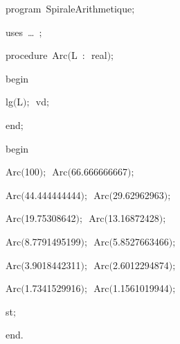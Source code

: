 
{
\parindent {}
\medskip

\carrenoir
\vspace{\neglskip}\mbox{\blc  \idt  \mcl program\idt\ SpiraleArithmetique$;$
}\par 
\vspace{\neglskip}\mbox{\blc \blk\idt \mcl uses\idt \ \ldots\ $;$
}\par 
\medskip

\pagebreak[3] 
\vspace{\neglskip}\mbox{\blc  \blk\idt  \mcl procedure\idt \ Arc$($L\ $:$\ real$)$$;$}\par 
\vspace{\neglskip}\mbox{\blc  \blk\idt  \mcl begin\idt }\par 
\vspace{\neglskip}\mbox{\blc  \blk\blk\idt  lg$($L$)$$;$\ vd$;$}\par 
\vspace{\neglskip}\mbox{\blc  \blk\idt  \mcl end\idt $;$}\par 
\medskip

\vspace{\neglskip}\mbox{\blc  \idt  \mcl begin\idt }\par 
\vspace{\neglskip}\mbox{\blc  \blk\idt  Arc$($100$)$$;$\ Arc$($66$.$666666667$)$$;$\ }\par 
\vspace{\neglskip}\mbox{\blc  \blk\idt  Arc$($44$.$444444444$)$$;$\ Arc$($29$.$62962963$)$$;$\ }\par 
\vspace{\neglskip}\mbox{\blc  \blk\idt  Arc$($19$.$75308642$)$$;$\ Arc$($13$.$16872428$)$$;$\ }\par 
\vspace{\neglskip}\mbox{\blc  \blk\idt  Arc$($8$.$7791495199$)$$;$\ Arc$($5$.$8527663466$)$$;$\ }\par 
\vspace{\neglskip}\mbox{\blc  \blk\idt  Arc$($3$.$9018442311$)$$;$\ Arc$($2$.$6012294874$)$$;$\ }\par 
\vspace{\neglskip}\mbox{\blc  \blk\idt  Arc$($1$.$7341529916$)$$;$\ Arc$($1$.$1561019944$)$$;$\ }\par 
\vspace{\neglskip}\mbox{\blc  \blk\idt  st$;$}\par 
\vspace{\neglskip}\mbox{\blc  \idt  \mcl end\idt $.$}\par 

\medskip }

